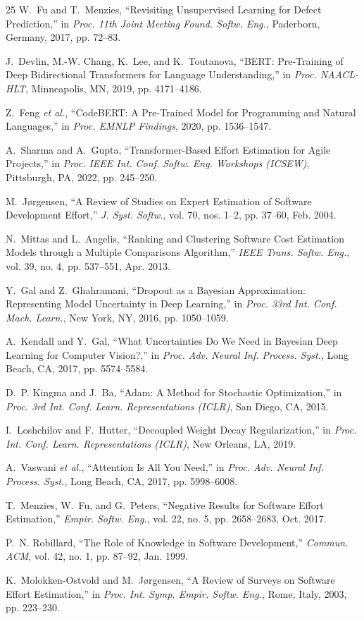 \documentclass[conference]{IEEEtran}
\begin{document}
\begin{thebibliography}{25}
W.~Fu and T.~Menzies, ``Revisiting Unsupervised Learning for Defect Prediction,'' in \textit{Proc. 11th Joint Meeting Found. Softw. Eng.}, Paderborn, Germany, 2017, pp. 72--83.

J.~Devlin, M.-W. Chang, K.~Lee, and K.~Toutanova, ``BERT: Pre-Training of Deep Bidirectional Transformers for Language Understanding,'' in \textit{Proc. NAACL-HLT}, Minneapolis, MN, 2019, pp. 4171--4186.

Z.~Feng \textit{et al.}, ``CodeBERT: A Pre-Trained Model for Programming and Natural Languages,'' in \textit{Proc. EMNLP Findings}, 2020, pp. 1536--1547.

A.~Sharma and A.~Gupta, ``Transformer-Based Effort Estimation for Agile Projects,'' in \textit{Proc. IEEE Int. Conf. Softw. Eng. Workshops (ICSEW)}, Pittsburgh, PA, 2022, pp. 245--250.

M.~J{\o}rgensen, ``A Review of Studies on Expert Estimation of Software Development Effort,'' \textit{J. Syst. Softw.}, vol. 70, nos. 1--2, pp. 37--60, Feb. 2004.

N.~Mittas and L.~Angelis, ``Ranking and Clustering Software Cost Estimation Models through a Multiple Comparisons Algorithm,'' \textit{IEEE Trans. Softw. Eng.}, vol. 39, no. 4, pp. 537--551, Apr. 2013.

Y.~Gal and Z.~Ghahramani, ``Dropout as a Bayesian Approximation: Representing Model Uncertainty in Deep Learning,'' in \textit{Proc. 33rd Int. Conf. Mach. Learn.}, New York, NY, 2016, pp. 1050--1059.

A.~Kendall and Y.~Gal, ``What Uncertainties Do We Need in Bayesian Deep Learning for Computer Vision?,'' in \textit{Proc. Adv. Neural Inf. Process. Syst.}, Long Beach, CA, 2017, pp. 5574--5584.

D.~P. Kingma and J.~Ba, ``Adam: A Method for Stochastic Optimization,'' in \textit{Proc. 3rd Int. Conf. Learn. Representations (ICLR)}, San Diego, CA, 2015.

I.~Loshchilov and F.~Hutter, ``Decoupled Weight Decay Regularization,'' in \textit{Proc. Int. Conf. Learn. Representations (ICLR)}, New Orleans, LA, 2019.

A.~Vaswani \textit{et al.}, ``Attention Is All You Need,'' in \textit{Proc. Adv. Neural Inf. Process. Syst.}, Long Beach, CA, 2017, pp. 5998--6008.

T.~Menzies, W.~Fu, and G.~Peters, ``Negative Results for Software Effort Estimation,'' \textit{Empir. Softw. Eng.}, vol. 22, no. 5, pp. 2658--2683, Oct. 2017.

P.~N. Robillard, ``The Role of Knowledge in Software Development,'' \textit{Commun. ACM}, vol. 42, no. 1, pp. 87--92, Jan. 1999.

K.~Molo{}kken-Ostvold and M.~J{\o}rgensen, ``A Review of Surveys on Software Effort Estimation,'' in \textit{Proc. Int. Symp. Empir. Softw. Eng.}, Rome, Italy, 2003, pp. 223--230.

\end{thebibliography}
\end{document}
